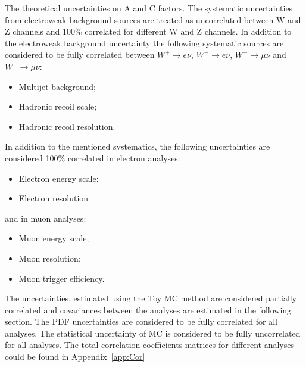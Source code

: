 The theoretical uncertainties on A and C factors. The systematic uncertainties from electroweak background sources are treated as uncorrelated between W and Z channels and 100\% correlated for different W and Z channels. In addition to the electroweak background uncertainty the following systematic sources are considered to be fully correlated between $W^{+}\to e\nu$, $W^{-}\to e\nu$, $W^{+}\to \mu \nu$ and $W^{-}\to \mu \nu$:
\begin{itemize}
\item Multijet background;
\item Hadronic recoil scale;
\item Hadronic recoil resolution.
\end{itemize}

In addition to the mentioned systematics, the following uncertainties are considered 100\% correlated in electron analyses:
\begin{itemize}
\item Electron energy scale;
\item Electron resolution
\end{itemize}
and in muon analyses:
\begin{itemize}
\item Muon energy scale;
\item Muon resolution;
\item Muon trigger efficiency.
\end{itemize}

The uncertainties, estimated using the Toy MC method are considered partially correlated and covariances between the analyses are estimated in the following section. The PDF uncertainties are considered to be fully correlated for all analyses. The statistical uncertainty of MC is considered to be fully uncorrelated for all analyses. The total correlation coefficients matrices for different analyses could be found in Appendix~\ref{app:Cor}

